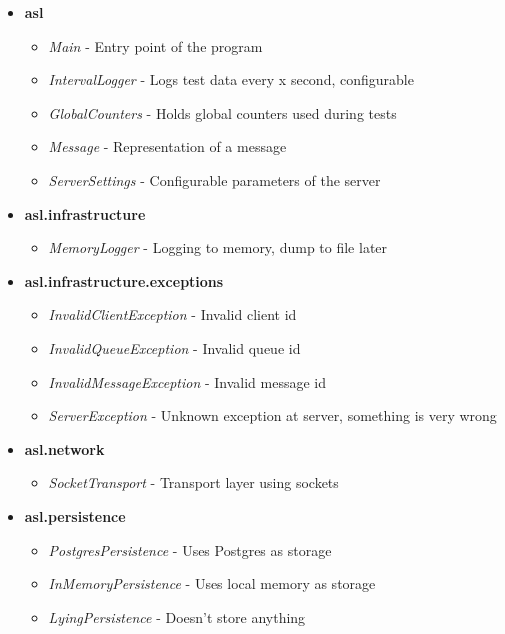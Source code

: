 \documentclass{article}
\begin{document}
            \begin{itemize}
                \item \textbf{asl}
                \begin{itemize}
                    \item \textit{Main} - Entry point of the program
                    \item \textit{IntervalLogger} - Logs test data every x second, configurable
                    \item \textit{GlobalCounters} - Holds global counters used during tests
                    \item \textit{Message} - Representation of a message
                    \item \textit{ServerSettings} - Configurable parameters of the server
                \end{itemize}
                \item \textbf{asl.infrastructure}
                \begin{itemize}
                    \item \textit{MemoryLogger} - Logging to memory, dump to file later
                \end{itemize}
                \item \textbf{asl.infrastructure.exceptions}
                \begin{itemize}
                    \item \textit{InvalidClientException} - Invalid client id
                    \item \textit{InvalidQueueException} - Invalid queue id
                    \item \textit{InvalidMessageException} - Invalid message id
                    \item \textit{ServerException} - Unknown exception at server, something is very wrong
                \end{itemize}
                \item \textbf{asl.network}
                \begin{itemize}
                    \item \textit{SocketTransport} - Transport layer using sockets
                \end{itemize}
                \item \textbf{asl.persistence}
                \begin{itemize}
                    \item \textit{PostgresPersistence} - Uses Postgres as storage
                    \item \textit{InMemoryPersistence} - Uses local memory as storage
                    \item \textit{LyingPersistence} - Doesn't store anything
                \end{itemize}
            \end{itemize}
\end{document}

